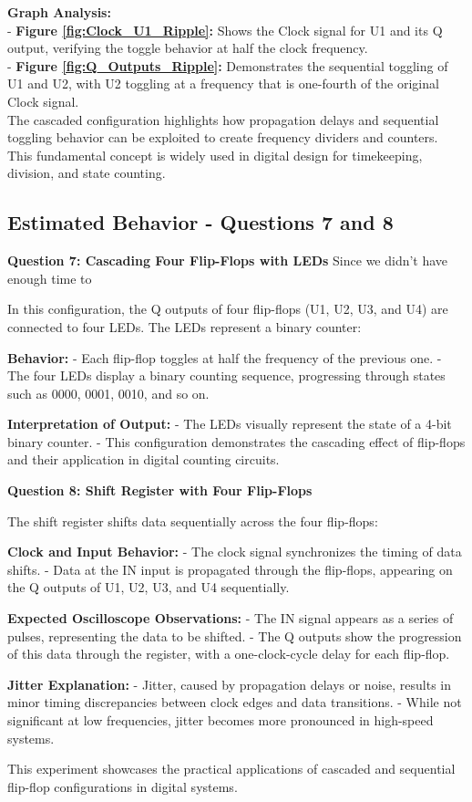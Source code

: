 \documentclass{article}
\begin{document}
    \textbf{Graph Analysis:} \\
    - \textbf{Figure \ref{fig:Clock_U1_Ripple}:} Shows the Clock signal for U1 and its Q output, verifying the toggle behavior at half the clock frequency. \\
    - \textbf{Figure \ref{fig:Q_Outputs_Ripple}:} Demonstrates the sequential toggling of U1 and U2, with U2 toggling at a frequency that is one-fourth of the original Clock signal. \\

    The cascaded configuration highlights how propagation delays and sequential toggling behavior can be exploited to create frequency dividers and counters. This fundamental concept is widely used in digital design for timekeeping, division, and state counting.

    \subsection*{\textbf{Estimated Behavior - Questions 7 and 8}}

    \textbf{Question 7: Cascading Four Flip-Flops with LEDs}
    Since we didn't have enough time to 

    In this configuration, the Q outputs of four flip-flops (U1, U2, U3, and U4) are connected to four LEDs. The LEDs represent a binary counter:

    \textbf{Behavior:}
    - Each flip-flop toggles at half the frequency of the previous one.
    - The four LEDs display a binary counting sequence, progressing through states such as 0000, 0001, 0010, and so on.

    \textbf{Interpretation of Output:}
    - The LEDs visually represent the state of a 4-bit binary counter.
    - This configuration demonstrates the cascading effect of flip-flops and their application in digital counting circuits.

    \textbf{Question 8: Shift Register with Four Flip-Flops}

    The shift register shifts data sequentially across the four flip-flops:

    \textbf{Clock and Input Behavior:}
    - The clock signal synchronizes the timing of data shifts.
    - Data at the IN input is propagated through the flip-flops, appearing on the Q outputs of U1, U2, U3, and U4 sequentially.

    \textbf{Expected Oscilloscope Observations:}
    - The IN signal appears as a series of pulses, representing the data to be shifted.
    - The Q outputs show the progression of this data through the register, with a one-clock-cycle delay for each flip-flop.

    \textbf{Jitter Explanation:}
    - Jitter, caused by propagation delays or noise, results in minor timing discrepancies between clock edges and data transitions.
    - While not significant at low frequencies, jitter becomes more pronounced in high-speed systems.

    This experiment showcases the practical applications of cascaded and sequential flip-flop configurations in digital systems.

    


  
\end{document}
